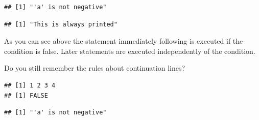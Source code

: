 \documentclass[krantz2]{krantz}\usepackage{knitr}%
\begin{document}
\begin{knitrout}\footnotesize
{}\color{fgcolor}\begin{kframe}
\begin{alltt}
 \hlkwb{<-} 
  \hlopt{<} \hlstd{)} \hlstd{(}\hlstd{)}  \hlstd{(}\hlstd{)}
\end{alltt}
\begin{verbatim}
## [1] "'a' is not negative"
\end{verbatim}
\begin{alltt}
\hlstd{(}\hlstd{)}
\end{alltt}
\begin{verbatim}
## [1] "This is always printed"
\end{verbatim}
\end{kframe}
\end{knitrout}

As you can see above the statement immediately following  is executed if the condition is false. Later statements are executed independently of the condition.

Do you still remember the rules about continuation lines?

\begin{knitrout}\footnotesize
{}\color{fgcolor}\begin{kframe}
\begin{verbatim}
## [1] 1 2 3 4
## [1] FALSE
\end{verbatim}
\end{kframe}
\end{knitrout}

\begin{knitrout}\footnotesize
{}\color{fgcolor}\begin{kframe}
\begin{alltt}
 \hlkwb{<-} 
  \hlopt{<} \hlstd{)}
  \hlstd{(}\hlstd{)} 
    \hlstd{(}\hlstd{)}
\end{alltt}
\begin{verbatim}
## [1] "'a' is not negative"
\end{verbatim}
\end{kframe}
\end{knitrout}
\end{document}
